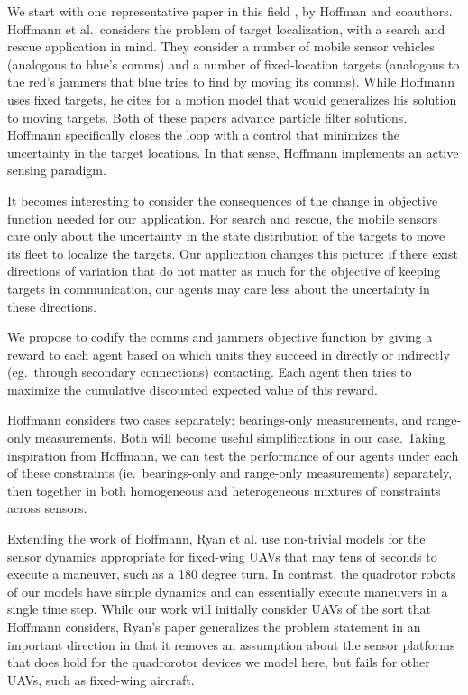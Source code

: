 \documentclass{article}
\begin{document}
We start with one representative paper in this field
\cite{hoffmann2009mobile}, by Hoffman and coauthors.  Hoffmann et al.\
considers the problem of target localization, with a search and rescue
application in mind.  They consider a number of mobile sensor vehicles
(analogous to blue's comms) and a number of fixed-location targets
(analogous to the red's jammers that blue tries to find by moving its
comms).  While Hoffmann uses fixed targets, he cites
\cite{gustafsson2002particle} for a motion model that would
generalizes his solution to moving targets.  Both of these papers
advance particle filter solutions.  Hoffmann specifically closes the
loop with a control that minimizes the uncertainty in the target
locations.  In that sense, Hoffmann implements an active sensing
paradigm.

It becomes interesting to consider the consequences of the change in
objective function needed for our application.  For search and rescue,
the mobile sensors care only about the uncertainty in the state
distribution of the targets to move its fleet to localize the targets.
Our application changes this picture: if there exist directions of
variation that do not matter as much for the objective of keeping
targets in communication, our agents may care less about the
uncertainty in these directions.

We propose to codify the comms and jammers objective function by
giving a reward to each agent based on which units they succeed in
directly or indirectly (eg.\ through secondary connections)
contacting.  Each agent then tries to maximize the cumulative
discounted expected value of this reward.

Hoffmann considers two cases separately: bearings-only measurements,
and range-only measurements.  Both will become useful simplifications
in our case.  Taking inspiration from Hoffmann, we can test the
performance of our agents under each of these constraints (ie.\
bearings-only and range-only measurements) separately, then together
in both homogeneous and heterogeneous mixtures of constraints across
sensors.

Extending the work of Hoffmann, Ryan et al. \cite{ryan2010particle}
use non-trivial models for the sensor dynamics appropriate for
fixed-wing UAVs that may tens of seconds to execute a maneuver, such
as a 180 degree turn.  In contrast, the quadrotor robots
\cite{hoffmann2007quadrotor} of our models have simple dynamics and
can essentially execute maneuvers in a single time step.  While our
work will initially consider UAVs of the sort that Hoffmann considers,
Ryan's paper generalizes the problem statement in an important
direction in that it removes an assumption about the sensor platforms
that does hold for the quadrorotor devices we model here, but fails
for other UAVs, such as fixed-wing aircraft.
\end{document}
